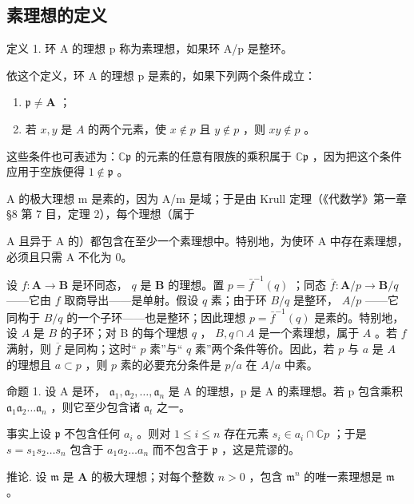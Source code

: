 \subsection{素理想的定义}

定义 1. 环 A 的理想 p 称为素理想，如果环 A/p 是整环。

依这个定义，环 A 的理想 p 是素的，如果下列两个条件成立：

\begin{enumerate}
\def\labelenumi{(\arabic{enumi})}
\item
  \(\mathfrak{p} \neq \mathbf{A}\) ；
\item
  若 \(x, y\) 是 \(A\) 的两个元素，使 \(x \notin p\) 且 \(y \notin p\) ，则 \(xy \notin p\) 。
\end{enumerate}

这些条件也可表述为：\(\mathbb{C}\mathfrak{p}\) 的元素的任意有限族的乘积属于 \(\mathbb{C}\mathfrak{p}\) ，因为把这个条件应用于空族便得 \(1\notin\mathfrak{p}\) 。

A 的极大理想 m 是素的，因为 A/m 是域；于是由 Krull 定理（《代数学》第一章 §8 第 7 目，定理 2），每个理想（属于

A 且异于 A 的）都包含在至少一个素理想中。特别地，为使环 A 中存在素理想，必须且只需 A 不化为 0。

设 \(f: \mathbf{A} \to \mathbf{B}\) 是环同态， \(q\) 是 \(\mathbf{B}\) 的理想。置 \(p = \bar{f}^{-1}(q)\) ；同态 \(\overline{f}: \mathbf{A}/p \to \mathbf{B}/q\) ——它由 \(f\) 取商导出——是单射。假设 \(q\) 素；由于环 \(B/q\) 是整环， \(A/p\) ——它同构于 \(B/q\) 的一个子环——也是整环；因此理想 \(p = \bar{f}^{-1}(q)\) 是素的。特别地，设 \(A\) 是 \(B\) 的子环；对 B 的每个理想 \(q\) ， \(B, q \cap A\) 是一个素理想，属于 \(A\) 。若 \(f\) 满射，则 \(\overline{f}\) 是同构；这时`` \(p\) 素''与`` \(q\) 素''两个条件等价。因此，若 \(p\) 与 \(a\) 是 \(A\) 的理想且 \(a \subset p\) ，则 \(p\) 素的必要充分条件是 \(p/a\) 在 \(A/a\) 中素。

命题 1. 设 A 是环， \(\mathfrak{a}_1, \mathfrak{a}_2, \ldots, \mathfrak{a}_n\) 是 A 的理想，p 是 A 的素理想。若 p 包含乘积 \(\mathfrak{a}_1\mathfrak{a}_2 \ldots \mathfrak{a}_n\) ，则它至少包含诸 \(\mathfrak{a}_t\) 之一。

事实上设 \(\mathfrak{p}\) 不包含任何 \(a_{i}\) 。则对 \(1 \leqslant i \leqslant n\) 存在元素 \(s_{i} \in a_{i} \cap \mathbb{C}p\) ；于是 \(s = s_{1}s_{2} \ldots s_{n}\) 包含于 \(a_{1}a_{2} \ldots a_{n}\) 而不包含于 \(\mathfrak{p}\) ，这是荒谬的。

推论. 设 \(\mathfrak{m}\) 是 \(\mathbf{A}\) 的极大理想；对每个整数 \(n > 0\) ，包含 \(\mathfrak{m}^n\) 的唯一素理想是 \(\mathfrak{m}\) 。

